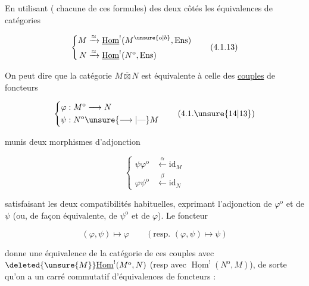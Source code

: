 
En utilisant ( chacune de ces formules) des deux côtés les équivalences de catégories

\[
\left\{\begin{aligned}
M&\xrightarrow{\approx}\underline{\operatorname{Hom}}^{!}(M^{\unsure{\mathrm{o}|b}},\mathrm{Ens})\\
N&\xrightarrow{\approx}\underline{\operatorname{Hom}}^{!}(N^{\mathrm{o}},\mathrm{Ens})
\end{aligned}\right.
\tag*{(4.1.13)}
\]

On peut dire  que la catégorie $M\overline{\boxtimes}N$ est équivalente à celle des \uline{couples} de foncteurs

\[
\left\{\begin{aligned}
\varphi &: M^{\mathrm{o}}\longrightarrow N\\
\psi &: N^{\mathrm{o}}\unsure{\longrightarrow|\text{---}}M
\end{aligned}\right.
\tag*{(4.1.\unsure{14|13})}
\]

   munis  deux morphismes d'adjonction

\[
\left\{\begin{aligned}
\psi\varphi^{\mathrm{o}}&\xleftarrow{\alpha}\mathrm{id}_{M}\\
\varphi\psi^{\mathrm{o}}&\xleftarrow{\beta}\mathrm{id}_{N}
\end{aligned}\right.
\tag*{(4.1.15)}
\]

satisfaisant les deux compatibilités habituelles, exprimant l'adjonction de $\varphi^{\mathrm{o}}$ et de $\psi$ (ou, de façon équivalente, de $\psi^{\mathrm{o}}$ et de $\varphi$). Le foncteur

\[
(\varphi,\psi)\longmapsto\varphi\qquad(\text{resp. }(\varphi,\psi)\longmapsto\psi)
\]

donne une équivalence de la catégorie de ces couples avec $\deleted{\unsure{M}}\underline{\operatorname{Hom}}^{!}(M^{\mathrm{o}},N)$ (resp avec $\underline{\operatorname{Hom}}^{!}(N^{\mathrm{o}},M)$), de sorte qu'on a un carré commutatif d'équivalences  de foncteurs :
